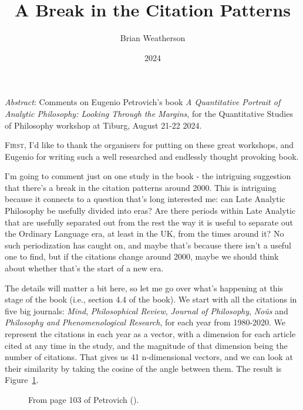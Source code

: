 \documentclass[
  11pt,
  letterpaper,
  DIV=11,
  numbers=noendperiod,
  twoside]{scrartcl}
\title{A Break in the Citation Patterns}
\author{Brian Weatherson}
\date{2024}
\makeatletter
\newcommand*\pandocbounded[1]{%
  \sbox\pandoc@box{#1}%
  \Gscale@div\@tempa{\textheight}{\dimexpr\ht\pandoc@box+\dp\pandoc@box\relax}%
  \Gscale@div\@tempb{\linewidth}{\wd\pandoc@box}%
  \ifdim\@tempb\p@<\@tempa\p@\let\@tempa\@tempb\fi%
  \ifdim\@tempa\p@<\p@\scalebox{\@tempa}{\usebox\pandoc@box}%
  \else\usebox{\pandoc@box}%
  \fi%
}
\renewenvironment{abstract}
 {\vspace{-1.25cm}
 \quotation\small\noindent\emph{Abstract}:}
 {\endquotation}
\renewenvironment{abstract}
 {\quotation\small\noindent\emph{Abstract}:}
 {\endquotation\vspace{-0.02cm}}
\makeatother
\begin{document}
\maketitle
\begin{abstract}
Comments on Eugenio Petrovich's book \emph{A Quantitative Portrait of
Analytic Philosophy: Looking Through the Margins}, for the Quantitative
Studies of Philosophy workshop at Tiburg, August 21-22 2024.
\end{abstract}


\lettrine{F}{irst}, I'd like to thank the organisers for putting on
these great workshops, and Eugenio for writing such a well researched
and endlessly thought provoking book.

I'm going to comment just on one study in the book - the intriguing
suggestion that there's a break in the citation patterns around 2000.
This is intriguing because it connects to a question that's long
interested me: can Late Analytic Philosophy be usefully divided into
eras? Are there periods within Late Analytic that are usefully separated
out from the rest the way it is useful to separate out the Ordinary
Language era, at least in the UK, from the times around it? No such
periodization has caught on, and maybe that's because there isn't a
useful one to find, but if the citations change around 2000, maybe we
should think about whether that's the start of a new era.

The details will matter a bit here, so let me go over what's happening
at this stage of the book (i.e., section 4.4 of the book). We start with
all the citations in five big journals: \emph{Mind}, \emph{Philosophical
Review}, \emph{Journal of Philosophy}, \emph{Noûs} and \emph{Philosophy
and Phenomenological Research}, for each year from 1980-2020. We
represent the citations in each year as a vector, with a dimension for
each article cited at any time in the study, and the magnitude of that
dimension being the number of citations. That gives us 41 n-dimensional
vectors, and we can look at their similarity by taking the cosine of the
angle between them. The result is Figure~\ref{fig-eugenio-matrix}.

\begin{figure}

\centering{

\pandocbounded{\texttt{[image: cosine-screenshot.png]}}

}

\caption{\label{fig-eugenio-matrix}From page 103 of Petrovich
().}

\end{figure}%
\end{document}
